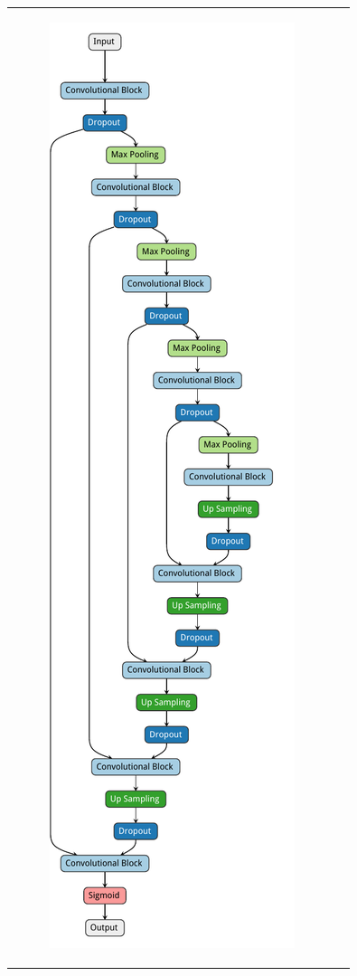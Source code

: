 \begin{figure}

	\centering

	\begin{tabularx}{\textwidth}{cX}
		\begin{subfigure}[b]{0.40\textwidth}
			\centering
			\includegraphics[height=0.90\textheight]{figures/unet_arch.pdf}

\end{subfigure}
\end{tabularx}
\end{figure}
